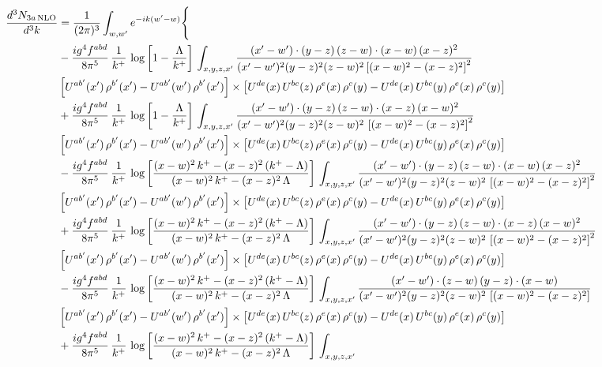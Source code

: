 \documentclass[9pt]{article}
\numberwithin{equation}{section}
\begin{document}
\begin{align}
\frac{d^{3}N_{3a\,\rm NLO}}{d^{3}k} & =\frac{1}{(2\pi)^{3}}\int_{w,w'}e^{-ik(w'-w)}\Bigg\{\notag \\ & -\frac{ig^{4}f^{abd}}{8\pi^{5}}\,\frac{1}{k^{+}}\, \log{\left[1-\frac{\Lambda}{k^{+}}\right]}\,\int_{x,y,z,x'}
\frac{(x'-w')\cdot(y-z)\,(z-w)\cdot(x-w)\,(x-z)^{2}}{(x'-w')^{2}(y-z)^{2}(z-w)^{2}\left[(x-w)^{2}-(x-z)^{2}\right]^{2}}\notag \\ & \left[U^{ab'}(x')\,\rho^{b'}(x')-U^{ab'}(w')\, \rho^{b'}(x')\right]\times \left[U^{de}(x)\,U^{bc}(z)\, \rho^{e}(x)\,\rho^{c}(y)-U^{de}(x)\,U^{bc}(y)\,\rho^{e}(x)\,\rho^{c}(y)\right]\notag \\ & +\frac{ig^{4}f^{abd}}{8\pi^{5}}\,\frac{1}{k^{+}}\, \log{\left[1-\frac{\Lambda}{k^{+}}\right]}\,\int_{x,y,z,x'}
\frac{(x'-w')\cdot(y-z)\,(z-w)\cdot(x-z)\,(x-w)^{2}}{(x'-w')^{2}(y-z)^{2}(z-w)^{2}\,\left[(x-w)^{2}-(x-z)^{2}\right]^{2}}\notag \\ & \left[U^{ab'}(x')\,\rho^{b'}(x')-U^{ab'}(w')\, \rho^{b'}(x')\right]\times \left[U^{de}(x)\,U^{bc}(z)\, \rho^{e}(x)\,\rho^{c}(y)-U^{de}(x)\,U^{bc}(y)\,\rho^{e}(x)\,\rho^{c}(y)\right]\notag \\ & 
-\frac{ig^{4}f^{abd}}{8\pi^{5}}\,\frac{1}{k^{+}}\,\log{\left[\frac{(x-w)^{2}\,k^{+}-(x-z)^{2}\,(k^{+}-\Lambda)}{(x-w)^{2}\,k^{+}-(x-z)^{2}\,\Lambda}\right]}\,\int_{x,y,z,x'}
\frac{(x'-w')\cdot(y-z)\,(z-w)\cdot(x-w)\,(x-z)^{2}}{(x'-w')^{2}(y-z)^{2}(z-w)^{2}\,\left[(x-w)^{2}-(x-z)^{2}\right]^{2}}\notag \\ & \left[U^{ab'}(x')\,\rho^{b'}(x')-U^{ab'}(w')\, \rho^{b'}(x')\right]\times \left[U^{de}(x)\,U^{bc}(z)\, \rho^{e}(x)\,\rho^{c}(y)-U^{de}(x)\,U^{bc}(y)\,\rho^{e}(x)\,\rho^{c}(y)\right]\notag \\ & +\frac{ig^{4}f^{abd}}{8\pi^{5}}\,\frac{1}{k^{+}}\,\log{\left[\frac{(x-w)^{2}\,k^{+}-(x-z)^{2}\,(k^{+}-\Lambda)}{(x-w)^{2}\,k^{+}-(x-z)^{2}\,\Lambda}\right]}\,\int_{x,y,z,x'}
\frac{(x'-w')\cdot(y-z)\,(z-w)\cdot(x-z)\,(x-w)^{2}}{(x'-w')^{2}(y-z)^{2}(z-w)^{2}\,\left[(x-w)^{2}-(x-z)^{2}\right]^{2}}\notag \\ 
&\left[U^{ab'}(x')\,\rho^{b'}(x')-U^{ab'}(w')\, \rho^{b'}(x')\right]\times \left[U^{de}(x)\,U^{bc}(z)\, \rho^{e}(x)\,\rho^{c}(y)-U^{de}(x)\,U^{bc}(y)\,\rho^{e}(x)\,\rho^{c}(y)\right]\notag \\ & -\frac{ig^{4}f^{abd}}{8\pi^{5}}\,\frac{1}{k^{+}}\,\log{\left[\frac{(x-w)^{2}\,k^{+}-(x-z)^{2}\,(k^{+}-\Lambda)}{(x-w)^{2}\,k^{+}-(x-z)^{2}\,\Lambda}\right]}\,\int_{x,y,z,x'}
\frac{(x'-w')\cdot(z-w)\,(y-z)\cdot(x-w)}{(x'-w')^{2}(y-z)^{2}(z-w)^{2}\,\left[(x-w)^{2}-(x-z)^{2}\right]}\notag \\ & \left[U^{ab'}(x')\,\rho^{b'}(x')-U^{ab'}(w')\, \rho^{b'}(x')\right]\times \left[U^{de}(x)\,U^{bc}(z)\, \rho^{e}(x)\,\rho^{c}(y)-U^{de}(x)\,U^{bc}(y)\,\rho^{e}(x)\,\rho^{c}(y)\right]\notag \\ &  +\frac{ig^{4}f^{abd}}{8\pi^{5}}\,\frac{1}{k^{+}}\,\log{\left[\frac{(x-w)^{2}\,k^{+}-(x-z)^{2}\,(k^{+}-\Lambda)}{(x-w)^{2}\,k^{+}-(x-z)^{2}\,\Lambda}\right]}\,\int_{x,y,z,x'}

\end{align}
\end{document}
